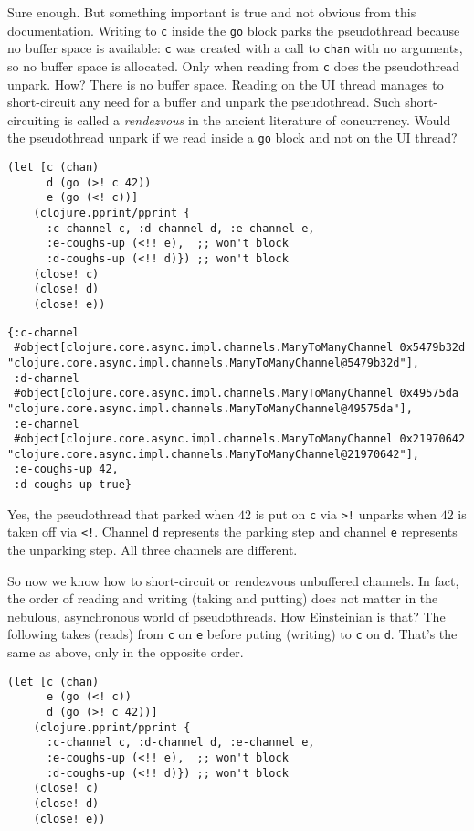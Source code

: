 \documentclass[10pt,oneside,x11names]{article}
\begin{document}
Sure enough. But something important is true and not obvious from this
documentation. Writing to \texttt{c} inside the \texttt{go} block parks the
pseudothread because no buffer space is available: \texttt{c} was created with
a call to \texttt{chan} with no arguments, so no buffer space is allocated.
Only when reading from \texttt{c} does the pseudothread unpark. How? There is
no buffer space. Reading on the UI thread manages to short-circuit any
need for a buffer and unpark the pseudothread. Such short-circuiting is
called a \emph{rendezvous} in the ancient literature of concurrency. Would
the pseudothread unpark if we read inside a \texttt{go} block and not on the UI
thread?

\begin{verbatim}
(let [c (chan)
      d (go (>! c 42))
      e (go (<! c))]
    (clojure.pprint/pprint {
      :c-channel c, :d-channel d, :e-channel e,
      :e-coughs-up (<!! e),  ;; won't block
      :d-coughs-up (<!! d)}) ;; won't block
    (close! c)
    (close! d)
    (close! e))
\end{verbatim}

\begin{verbatim}
{:c-channel
 #object[clojure.core.async.impl.channels.ManyToManyChannel 0x5479b32d "clojure.core.async.impl.channels.ManyToManyChannel@5479b32d"],
 :d-channel
 #object[clojure.core.async.impl.channels.ManyToManyChannel 0x49575da "clojure.core.async.impl.channels.ManyToManyChannel@49575da"],
 :e-channel
 #object[clojure.core.async.impl.channels.ManyToManyChannel 0x21970642 "clojure.core.async.impl.channels.ManyToManyChannel@21970642"],
 :e-coughs-up 42,
 :d-coughs-up true}
\end{verbatim}


Yes, the pseudothread that parked when \(42\) is put on \texttt{c} via \texttt{>!}
unparks when \(42\) is taken off via \texttt{<!}. Channel \texttt{d} represents the
parking step and channel \texttt{e} represents the unparking step. All three
channels are different.

So now we know how to short-circuit or rendezvous unbuffered channels.
In fact, the order of reading and writing (taking and putting) does not
matter in the nebulous, asynchronous world of pseudothreads. How
Einsteinian is that? The following takes (reads) from \texttt{c} on \texttt{e} before
puting (writing) to \texttt{c} on \texttt{d}. That's the same as above, only in the
opposite order.

\begin{verbatim}
(let [c (chan)
      e (go (<! c))
      d (go (>! c 42))]
    (clojure.pprint/pprint {
      :c-channel c, :d-channel d, :e-channel e,
      :e-coughs-up (<!! e),  ;; won't block
      :d-coughs-up (<!! d)}) ;; won't block
    (close! c)
    (close! d)
    (close! e))
\end{verbatim}
\end{document}
